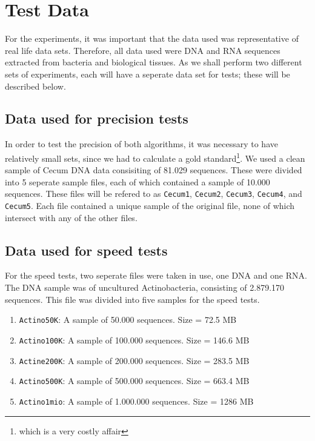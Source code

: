 \documentclass[../../main.tex]{subfiles}
\begin{document}
\section{Test Data}
For the experiments, it was important that the data used was representative of real life data sets. Therefore, all data used were DNA and RNA sequences extracted from bacteria and  biological tissues. As we shall perform two different sets of experiments, each will have a seperate data set for tests; these will be described below.
\subsection{Data used for precision tests}
In order to test the precision of both algorithms, it was necessary to have relatively small sets, since we had to calculate a gold standard\footnote{which is a very costly affair}. We used a clean sample of Cecum DNA data consisiting of 81.029 sequences. These were divided into 5 seperate sample files, each of which contained a sample of 10.000 sequences. These files will be refered to as \texttt{Cecum1}, \texttt{Cecum2}, \texttt{Cecum3}, \texttt{Cecum4}, and \texttt{Cecum5}. Each file contained a unique sample of the original file, none of which intersect with any of the other files.


\subsection{Data used for speed tests}
For the speed tests, two seperate files were taken in use, one DNA and one RNA. The DNA sample was of uncultured Actinobacteria, consisting of 2.879.170 sequences. This file was divided into five samples for the speed tests.
\begin{enumerate}
\item \texttt{Actino50K}: A sample of 50.000 sequences. Size = 72.5 MB
\item \texttt{Actino100K}: A sample of 100.000 sequences. Size = 146.6 MB
\item \texttt{Actine200K}: A sample of 200.000 sequences. Size = 283.5 MB
\item \texttt{Actino500K}: A sample of 500.000 sequences. Size = 663.4 MB
\item \texttt{Actino1mio}: A sample of 1.000.000 sequences. Size = 1286 MB
\end{enumerate}
\end{document}
